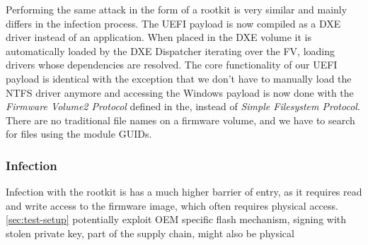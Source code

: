 Performing the same attack in the form of a rootkit is very similar and mainly differs in the infection process.
The \ac{UEFI} payload is now compiled as a \ac{DXE} driver instead of an application.
When placed in the \ac{DXE} volume it is automatically loaded by the \ac{DXE} Dispatcher iterating over the \ac{FV}, loading  drivers whose dependencies are resolved.
The core functionality of our \ac{UEFI} payload is identical with the exception that we don't have to manually load the \ac{NTFS} driver anymore and accessing the Windows payload is now done with the \emph{Firmware Volume2 Protocol} defined in the\cite[3.4.1]{pi-spec}, instead of \emph{Simple Filesystem Protocol}. There are no traditional file names on a firmware volume, and we have to search for files using the module \acp{GUID}.

\subsubsection{Infection}

Infection with the rootkit is has a much higher barrier of entry, as it requires read and write access to the firmware image, which often requires physical access.
\autoref{sec:test-setup} potentially exploit \ac{OEM} specific flash mechanism, signing with stolen private key, part of the supply chain, might also be physical 

